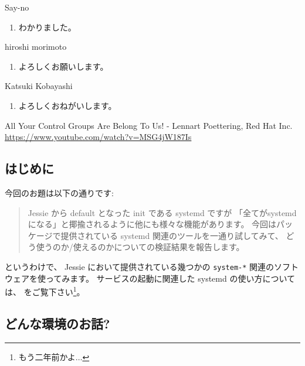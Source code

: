 \documentclass[mingoth,a4paper]{jsarticle}
\begin{document}
\begin{prework}{ Say-no }
  \begin{enumerate}
  \item わかりました。
  \end{enumerate}
\end{prework}

\begin{prework}{ hiroshi morimoto }
  \begin{enumerate}
  \item よろしくお願いします。
  \end{enumerate}
\end{prework}

\begin{prework}{ Katsuki Kobayashi }
  \begin{enumerate}
  \item よろしくおねがいします。
  \end{enumerate}
\end{prework}


\begin{flushright}
  All Your Control Groups Are Belong To Us! - Lennart Poettering, Red Hat Inc. \\
  \url{https://www.youtube.com/watch?v=MSG4jW187Is}
\end{flushright}

\subsection{はじめに}

今回のお題は以下の通りです:
\begin{quotation}
  Jessie から default となった init である systemd ですが
  「全てがsystemd になる」と揶揄されるように他にも様々な機能があります。
  今回はパッケージで提供されている systemd 関連のツールを一通り試してみて、
  どう使うのか/使えるのかについての検証結果を報告します。
\end{quotation}

というわけで、
Jessie において提供されている幾つかの \verb|system-*| 関連のソフトウェアを使ってみます。
%
サービスの起動に関連した systemd の使い方については、
\cite[前回(2014年6月)の勉強会資料]{佐々木(2014)}をご覧下さい\footnote{もう二年前かよ$\dots$}。

\subsection{どんな環境のお話?}
\end{document}
